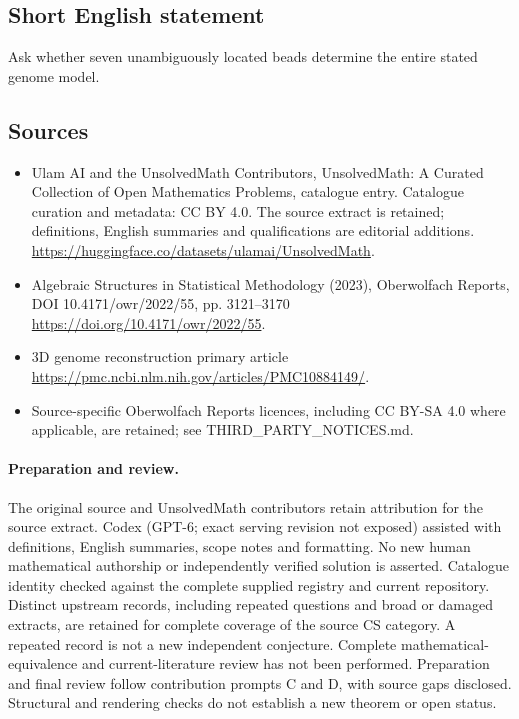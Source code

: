 \documentclass[11pt]{article}
\begin{document}
\subsection{Short English statement}
Ask whether seven unambiguously located beads determine the entire stated genome model.
\subsection{Sources}
\begin{itemize}
\item[\hypertarget{source:statement:1}{S1}] Ulam AI and the UnsolvedMath Contributors, UnsolvedMath: A Curated Collection of Open Mathematics Problems, catalogue entry. Catalogue curation and metadata: CC BY 4.0. The source extract is retained; definitions, English summaries and qualifications are editorial additions.
\url{https://huggingface.co/datasets/ulamai/UnsolvedMath}.
\item[\hypertarget{source:statement:2}{S2}] Algebraic Structures in Statistical Methodology (2023), Oberwolfach Reports, DOI 10.4171/owr/2022/55, pp. 3121--3170
\url{https://doi.org/10.4171/owr/2022/55}.
\item[\hypertarget{source:statement:3}{S3}] 3D genome reconstruction primary article
\url{https://pmc.ncbi.nlm.nih.gov/articles/PMC10884149/}.
\item Source-specific Oberwolfach Reports licences, including CC BY-SA 4.0 where applicable, are retained; see THIRD\_PARTY\_NOTICES.md.
\end{itemize}
\paragraph{Preparation and review.}
The original source and UnsolvedMath contributors retain attribution for the source extract. Codex (GPT-6; exact serving revision not exposed) assisted with definitions, English summaries, scope notes and formatting. No new human mathematical authorship or independently verified solution is asserted. Catalogue identity checked against the complete supplied registry and current repository. Distinct upstream records, including repeated questions and broad or damaged extracts, are retained for complete coverage of the source CS category. A repeated record is not a new independent conjecture. Complete mathematical-equivalence and current-literature review has not been performed. Preparation and final review follow contribution prompts C and D, with source gaps disclosed. Structural and rendering checks do not establish a new theorem or open status.
\label{end:statement}
\end{document}
